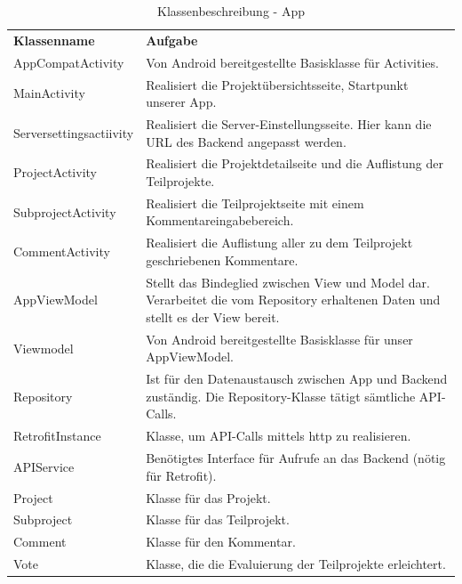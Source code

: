 \begin{table}[H]
	\centering
	\begin{tabularx}{\textwidth}{X X}
		\rowcolor[HTML]{C0C0C0} 
		\textbf{Klassenname} & \textbf{Aufgabe} \\
		AppCompatActivity &Von Android bereitgestellte Basisklasse für Activities. \\
		\rowcolor[HTML]{E7E7E7}
		MainActivity & Realisiert die Projektübersichtsseite, Startpunkt unserer App. \\
		 Serversettingsactiivity & Realisiert die Server-Einstellungsseite. Hier kann die URL des Backend angepasst werden. \\
		 \rowcolor[HTML]{E7E7E7}
		ProjectActivity & Realisiert die Projektdetailseite und die Auflistung der Teilprojekte. \\
		SubprojectActivity & Realisiert die Teilprojektseite mit einem Kommentareingabebereich.\\
		\rowcolor[HTML]{E7E7E7}
		CommentActivity & Realisiert die Auflistung aller zu dem Teilprojekt geschriebenen Kommentare.  \\
		AppViewModel & Stellt das Bindeglied zwischen View und Model dar.  Verarbeitet die vom Repository erhaltenen Daten und stellt es der View bereit.  \\
		\rowcolor[HTML]{E7E7E7}
		 Viewmodel &  Von Android bereitgestellte Basisklasse für unser AppViewModel. \\
		Repository & Ist für den Datenaustausch zwischen App und Backend zuständig. Die Repository-Klasse tätigt sämtliche API-Calls. \\
		\rowcolor[HTML]{E7E7E7}
		RetrofitInstance & Klasse, um API-Calls mittels http zu realisieren.  \\
		APIService & Benötigtes Interface für Aufrufe an das Backend (nötig für Retrofit).\\
		\rowcolor[HTML]{E7E7E7}
		Project & Klasse für das Projekt.\\
		Subproject & Klasse für das Teilprojekt.\\
		\rowcolor[HTML]{E7E7E7}
		Comment & Klasse für den Kommentar.\\
		Vote & Klasse, die die Evaluierung der Teilprojekte erleichtert.\\
	\end{tabularx}
	\caption{Klassenbeschreibung - App}
	\label{table:klassenbeschreibung-web-controller}
\end{table}